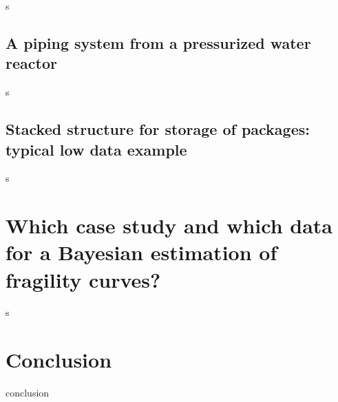 s

    
    \subsection{A piping system from a pressurized water reactor}


s


    \subsection{Stacked structure for storage of packages: typical low data example}

s


\section{Which case study and which data for a Bayesian estimation of fragility curves?}

s


\section{Conclusion}


conclusion


